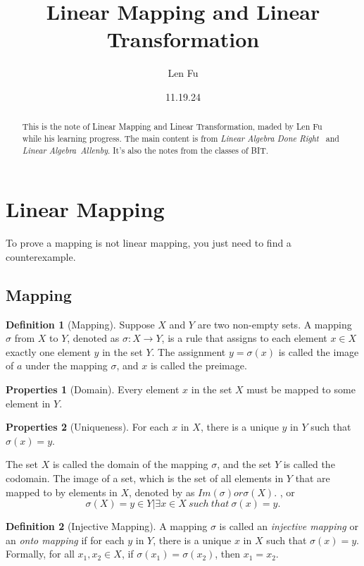 \documentclass{article}
\title{Linear Mapping and Linear Transformation}
\author{Len Fu}
\date{11.19.24}
\theoremstyle{definition}
\newtheorem{defi}{Definition}[section]
\newtheorem{pro}{Properties}[section]
\begin{document}
\maketitle

\begin{abstract}
This is the note of Linear Mapping and Linear Transformation, maded by Len Fu while his learning progress. 
The main content is from \textit{Linear Algebra Done Right}
\ and \textit{Linear Algebra\  Allenby}. It's also the notes from the classes of BIT.
\end{abstract}


\tableofcontents
\newpage

\section{Linear Mapping}
To prove a mapping is not linear mapping, you just need to find a counterexample.
\subsection{Mapping}
\begin{defi}[Mapping]
Suppose $X$ and $Y$ are two non-empty sets. A mapping $\sigma$
from $X$ to $Y$, denoted as $\sigma:X\rightarrow Y$, is a rule 
that assigns to each element $x\in X$ exactly one element $y$ 
in the set $Y$. The assignment $y=\sigma(x)$ is called the image of $a$
under the mapping $\sigma$, and $x$ is called the preimage. 
\end{defi}
\begin{pro}[Domain]
    Every element $x$ in the set $X$ must be mapped to some element in $Y$.
\end{pro}
\begin{pro}[Uniqueness]
    For each $x$ in $X$, there is a unique $y$ in $Y$ 
    such that $\sigma(x)=y$.
\end{pro}

The set $X$ is called the domain of the mapping $\sigma$, 
and the set $Y$ is called the codomain. The image of a set,
which is the set of all elements in $Y$ that are mapped 
to by elements in $X$, denoted by as $Im(\sigma) or \sigma(X)$.
, or $$\sigma(X)={y\in Y|\exists x\in X\ such\ that\ \sigma(x)=y}.$$

\begin{defi}[Injective Mapping]
    A mapping $\sigma$ is called an \textit{injective mapping} or an \textit{onto mapping}
    if for each $y$ in $Y$, there is a unique $x$ in $X$ such that $\sigma(x)=y$.
    Formally, for all $x_{1},x_{2}\in X$, if $\sigma(x_{1})=\sigma(x_{2})$, 
    then $x_{1}=x_{2}$.
\end{defi}
\end{document}
